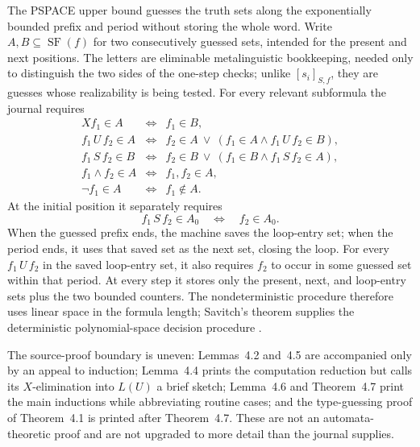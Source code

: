 The PSPACE upper bound guesses the truth sets along the exponentially bounded
prefix and period without storing the whole word.  Write \(A,B\subseteq
\operatorname{SF}(f)\) for two consecutively guessed sets, intended for the
present and next positions.  The letters are eliminable metalinguistic
bookkeeping, needed only to distinguish the two sides of the one-step checks;
unlike \([s_i]_{S,f}\), they are guesses whose realizability is being tested.
For every relevant subformula the journal requires
\[
\begin{array}{rcl}
 Xf_1\in A
 &\Longleftrightarrow& f_1\in B,\\
 f_1\,U\,f_2\in A
 &\Longleftrightarrow&
 f_2\in A\ \lor\
 (f_1\in A\land f_1\,U\,f_2\in B),\\
 f_1\,S\,f_2\in B
 &\Longleftrightarrow&
 f_2\in B\ \lor\
 (f_1\in B\land f_1\,S\,f_2\in A),\\
 f_1\land f_2\in A
 &\Longleftrightarrow& f_1,f_2\in A,\\
 \neg f_1\in A
 &\Longleftrightarrow& f_1\notin A.
\end{array}
\]
At the initial position it separately requires
\[
 f_1\,S\,f_2\in A_0\quad\Longleftrightarrow\quad f_2\in A_0.
\]
When the guessed prefix ends, the machine saves the loop-entry set; when the
period ends, it uses that saved set as the next set, closing the loop.  For
every \(f_1\,U\,f_2\) in the saved loop-entry set, it also requires \(f_2\)
to occur in some guessed set within that period.  At every step it stores only
the present, next, and loop-entry sets plus the two bounded counters.  The
nondeterministic procedure therefore uses linear space in the formula length;
Savitch's theorem supplies the deterministic polynomial-space decision procedure
\cite[pp.~742--745]{SistlaClarke1985}.

The source-proof boundary is uneven: Lemmas~4.2 and~4.5 are accompanied only
by an appeal to induction; Lemma~4.4 prints the computation reduction but
calls its \(X\)-elimination into \(L(U)\) a brief sketch; Lemma~4.6 and
Theorem~4.7 print the main inductions while abbreviating routine cases; and
the type-guessing proof of Theorem~4.1 is printed after Theorem~4.7.  These
are not an automata-theoretic proof and are not upgraded to more detail than
the journal supplies.

